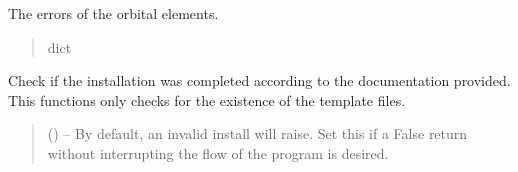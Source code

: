 \documentclass[letterpaper,11pt,english]{sphinxmanual}
\begin{document}
\begin{savenotes}
\begin{fulllineitems}
\begin{savenotes}
\begin{fulllineitems}
\end{fulllineitems}\end{savenotes}


\begin{savenotes}\begin{fulllineitems}
\label{\detokenize{code/opihiexarata.orbit.orbfit:opihiexarata.orbit.orbfit.OrbfitOrbitDeterminerEngine.orbital_elements_errors}}
\pysigstartsignatures
{}
\pysigstopsignatures
\sphinxAtStartPar
The errors of the orbital elements.
\begin{quote}\begin{description}
\sphinxAtStartPar
dict

\end{description}\end{quote}

\end{fulllineitems}\end{savenotes}


\begin{savenotes}\begin{fulllineitems}
\label{\detokenize{code/opihiexarata.orbit.orbfit:opihiexarata.orbit.orbfit.OrbfitOrbitDeterminerEngine.__check_installation}}
\pysigstartsignatures
{}
\pysigstopsignatures
\sphinxAtStartPar
Check if the installation was completed according to the
documentation provided. This functions only checks for the existence
of the template files.
\begin{quote}\begin{description}
\sphinxAtStartPar
{} (\sphinxstyleliteralemphasis{\sphinxupquote{, }}) – By default, an invalid install will raise. Set this if a False
return without interrupting the flow of the program is desired.


\end{description}
\end{quote}
\end{fulllineitems}
\end{savenotes}
\end{fulllineitems}
\end{savenotes}
\end{document}
